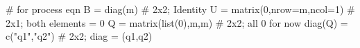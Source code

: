 \begin{Schunk}
\begin{Sinput}
 # for process eqn
 B = diag(m)                   # 2x2; Identity
 U = matrix(0,nrow=m,ncol=1)   # 2x1; both elements = 0
 Q = matrix(list(0),m,m)       # 2x2; all 0 for now
 diag(Q) = c("q1","q2")        # 2x2; diag = (q1,q2)
\end{Sinput}
\end{Schunk}
